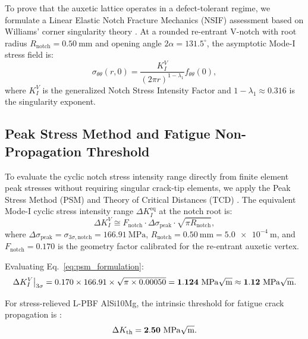To prove that the auxetic lattice operates in a defect-tolerant regime, we formulate a Linear Elastic Notch Fracture Mechanics (NSIF) assessment based on Williams' corner singularity theory \cite{williams1952}. At a rounded re-entrant V-notch with root radius $R_{\text{notch}} = \SI{0.50}{\milli\meter}$ and opening angle $2\alpha = 131.5^\circ$, the asymptotic Mode-I stress field is:
\begin{equation}
\sigma_{\theta\theta}(r, 0) = \frac{K_I^V}{(2\pi r)^{1 - \lambda_1}} f_{\theta\theta}(0),
\label{eq:nsif_williams}
\end{equation}
where $K_I^V$ is the generalized Notch Stress Intensity Factor and $1 - \lambda_1 \approx 0.316$ is the singularity exponent.

\subsection{Peak Stress Method and Fatigue Non-Propagation Threshold}

To evaluate the cyclic notch stress intensity range directly from finite element peak stresses without requiring singular crack-tip elements, we apply the Peak Stress Method (PSM) and Theory of Critical Distances (TCD) \cite{collini2024}. The equivalent Mode-I cyclic stress intensity range $\Delta K_I^{\text{eq}}$ at the notch root is:
\begin{equation}
\Delta K_I^V \cong F_{\text{notch}} \cdot \Delta \sigma_{\text{peak}} \cdot \sqrt{\pi R_{\text{notch}}},
\label{eq:psm_formulation}
\end{equation}
where $\Delta \sigma_{\text{peak}} = \sigma_{3\sigma,\text{notch}} = \SI{166.91}{\mega\pascal}$, $R_{\text{notch}} = \SI{0.50}{\milli\meter} = \SI{5.0e-4}{\meter}$, and $F_{\text{notch}} = 0.170$ is the geometry factor calibrated for the re-entrant auxetic vertex.

Evaluating Eq.~\eqref{eq:psm_formulation}:
\begin{equation}
\Delta K_I^V\big|_{3\sigma} = 0.170 \times 166.91 \times \sqrt{\pi \times 0.00050} = \mathbf{1.124\ \si{\mega\pascal\sqrt{\meter}}} \approx \mathbf{1.12\ \si{\mega\pascal\sqrt{\meter}}}.
\label{eq:k1_calculated}
\end{equation}

For stress-relieved L-PBF AlSi10Mg, the intrinsic threshold for fatigue crack propagation is \cite{collini2024}:
\begin{equation}
\Delta K_{\text{th}} = \mathbf{2.50\ \si{\mega\pascal\sqrt{\meter}}}.
\label{eq:kth_threshold}
\end{equation}

